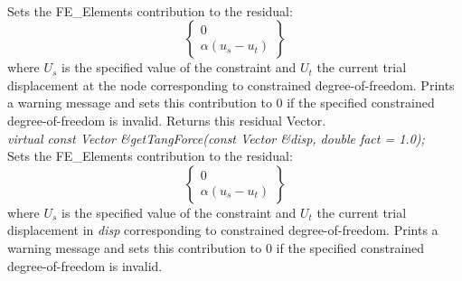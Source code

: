  \\
Sets the FE\_Elements contribution to the residual:
\[ \left\{ \begin{array}{c} 0 \\ \alpha(u_s - u_t) \end{array} \right\} \]
where $U_s$ is the specified value of the
constraint and $U_t$ the current trial displacement at the node
corresponding to constrained degree-of-freedom. Prints a warning
message and sets this contribution to $0$ if the specified constrained
degree-of-freedom is invalid. Returns this residual Vector.\\


{\em virtual const Vector \&getTangForce(const Vector \&disp, double
fact = 1.0);    }\\
Sets the FE\_Elements contribution to the residual:
\[ \left\{ \begin{array}{c} 0 \\ \alpha(u_s - u_t) \end{array} \right\} \]
where $U_s$ is the specified value of the
constraint and $U_t$ the current trial displacement in {\em disp}
corresponding to constrained degree-of-freedom. Prints a warning
message and sets this contribution to $0$ if the specified constrained
degree-of-freedom is invalid. \\ 










